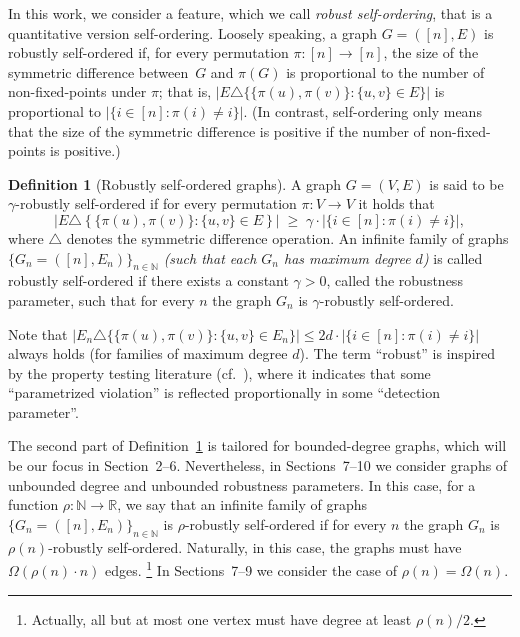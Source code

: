 \documentclass[10pt,a4paper]{article}
\theoremstyle{definition}
\newtheorem{definition}[theorem]{Definition}
\newcommand{\N}{\mathbb N}
\newcommand{\R}{\mathbb R}
\newcommand{\BD}{\begin{definition}}   \newcommand{\ED}{\end{definition}}
\begin{document}
In this work, we consider a feature,
which we call {\em robust self-ordering},
that is a quantitative version self-ordering.
%
Loosely speaking, a graph $G=([n],E)$ is robustly self-ordered if,
%
%
for every permutation $\pi:[n]\to[n]$,
the size of the symmetric difference between~$G$ and $\pi(G)$
is proportional to the number of non-fixed-points under $\pi$;
that is, $|E\triangle\{\{\pi(u),\pi(v)\}\!:\!\{u,v\}\!\in\!E\}|$
is proportional to $|\{i\!\in\![n]\!:\!\pi(i)\!\neq\!i\}|$.
(In contrast, self-ordering only means that
the size of the symmetric difference is positive
if the number of non-fixed-points is positive.)

%
\BD[Robustly self-ordered graphs]
\label{robust-asymmetric:def}
A graph $G=(V,E)$ is said to be {\sf $\gamma$-robustly self-ordered}
if for every permutation $\pi:V\to{V}$
it holds that
\begin{equation}\label{robust-asymmetric:eqdef}
\big|E\triangle\left\{\{\pi(u),\pi(v)\}\!:\!\{u,v\}\!\in\!E\right\}\big|
  \;\geq\; \gamma\cdot|\{i\in[n]\!:\!\pi(i)\neq i\}|,
\end{equation}
where $\triangle$ denotes the symmetric difference operation.
An infinite family of graphs $\{G_n=([n],E_n)\}_{n\in\N}$
{\em(such that each $G_n$ has maximum degree $d$)}
is called {\sf robustly self-ordered}
if there exists a constant $\gamma>0$, called the {\sf robustness parameter},
such that for every $n$ the graph $G_n$ is $\gamma$-robustly self-ordered.
\ED
Note that
$|E_n\triangle\{\{\pi(u),\pi(v)\}\!:\!\{u,v\}\!\in\!E_n\}|
 \leq 2d\cdot|\{i\in[n]\!:\!\pi(i)\neq i\}|$
always holds (for families of maximum degree $d$).
%
%
%
%
%
The term ``robust'' is inspired by
the property testing literature (cf.~\cite{RS}),
where it indicates that some ``parametrized violation''
is reflected proportionally in some ``detection parameter''.

The second part of Definition~\ref{robust-asymmetric:def}
is tailored for bounded-degree graphs, which will be our focus
in Section~2--6.
Nevertheless,
in Sections~7--10
we consider graphs
of unbounded degree and unbounded robustness parameters.
In this case, for a function $\rho:\N\to\R$,
we say that an infinite family of graphs $\{G_n=([n],E_n)\}_{n\in\N}$
is {\sf $\rho$-robustly self-ordered} if for every $n$
the graph $G_n$ is $\rho(n)$-robustly self-ordered.
Naturally, in this case, the graphs
must have $\Omega(\rho(n)\cdot n)$ edges.
\footnote{Actually, all but at most one vertex
must have degree at least $\rho(n)/2$.}
%
In Sections~7--9
we consider the case of $\rho(n)=\Omega(n)$.
\end{document}
